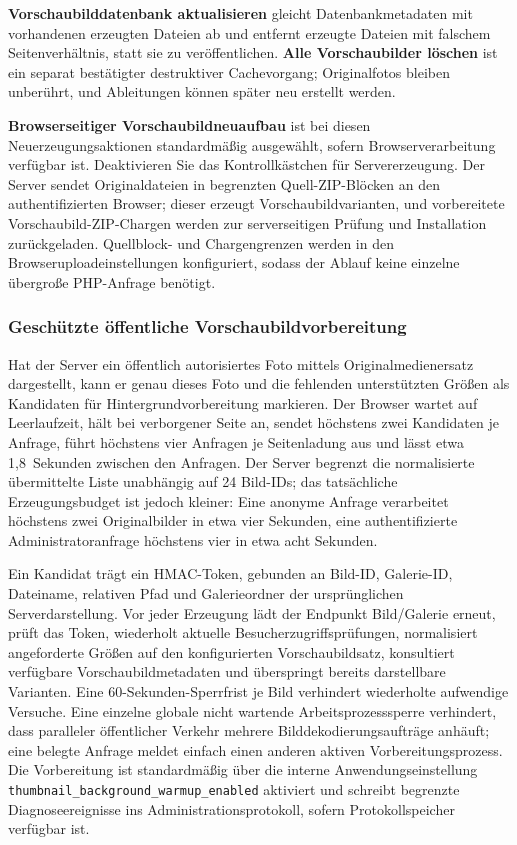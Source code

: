 \documentclass[11pt,a4paper]{article}
\newcommand{\setting}[1]{\nolinkurl{#1}}
\newcommand{\ui}[1]{\textbf{#1}}
\begin{document}
\ui{Vorschaubilddatenbank aktualisieren} gleicht Datenbankmetadaten mit
vorhandenen erzeugten Dateien ab und entfernt erzeugte Dateien mit falschem
Seitenverhältnis, statt sie zu veröffentlichen. \ui{Alle Vorschaubilder
löschen} ist ein separat bestätigter destruktiver Cachevorgang; Originalfotos
bleiben unberührt, und Ableitungen können später neu erstellt werden.

\ui{Browserseitiger Vorschaubildneuaufbau} ist bei diesen
Neuerzeugungsaktionen standardmäßig ausgewählt, sofern Browserverarbeitung
verfügbar ist. Deaktivieren Sie das Kontrollkästchen für Servererzeugung. Der
Server sendet Originaldateien in begrenzten Quell-ZIP-Blöcken an den
authentifizierten Browser; dieser erzeugt Vorschaubildvarianten, und
vorbereitete Vorschaubild-ZIP-Chargen werden zur serverseitigen Prüfung und
Installation zurückgeladen. Quellblock- und Chargengrenzen werden in den
Browseruploadeinstellungen konfiguriert, sodass der Ablauf keine einzelne
übergroße PHP-Anfrage benötigt.

\subsubsection{Geschützte öffentliche Vorschaubildvorbereitung}

Hat der Server ein öffentlich autorisiertes Foto mittels Originalmedienersatz
dargestellt, kann er genau dieses Foto und die fehlenden unterstützten Größen
als Kandidaten für Hintergrundvorbereitung markieren. Der Browser wartet auf
Leerlaufzeit, hält bei verborgener Seite an, sendet höchstens zwei Kandidaten je
Anfrage, führt höchstens vier Anfragen je Seitenladung aus und lässt etwa
1,8~Sekunden zwischen den Anfragen. Der Server begrenzt die normalisierte
übermittelte Liste unabhängig auf 24 Bild-IDs; das tatsächliche Erzeugungsbudget
ist jedoch kleiner: Eine anonyme Anfrage verarbeitet höchstens zwei
Originalbilder in etwa vier Sekunden, eine authentifizierte Administratoranfrage
höchstens vier in etwa acht Sekunden.

Ein Kandidat trägt ein HMAC-Token, gebunden an Bild-ID, Galerie-ID, Dateiname,
relativen Pfad und Galerieordner der ursprünglichen Serverdarstellung. Vor jeder
Erzeugung lädt der Endpunkt Bild/Galerie erneut, prüft das Token, wiederholt
aktuelle Besucherzugriffsprüfungen, normalisiert angeforderte Größen auf den
konfigurierten Vorschaubildsatz, konsultiert verfügbare Vorschaubildmetadaten
und überspringt bereits darstellbare Varianten. Eine 60-Sekunden-Sperrfrist je
Bild verhindert wiederholte aufwendige Versuche. Eine einzelne globale nicht
wartende Arbeitsprozesssperre verhindert, dass paralleler öffentlicher Verkehr
mehrere Bilddekodierungsaufträge anhäuft; eine belegte Anfrage meldet einfach
einen anderen aktiven Vorbereitungsprozess. Die Vorbereitung ist standardmäßig
über die interne Anwendungseinstellung
\setting{thumbnail_background_warmup_enabled} aktiviert und schreibt begrenzte
Diagnoseereignisse ins Administrationsprotokoll, sofern Protokollspeicher
verfügbar ist.
\end{document}
